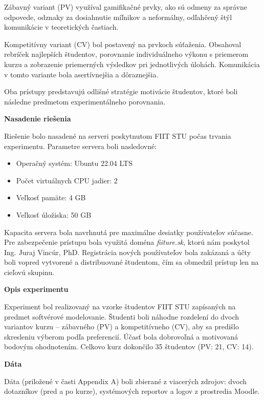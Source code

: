 
Zábavný variant (PV) využíval gamifikačné prvky, ako sú odmeny za správne odpovede, odznaky za dosiahnutie míľnikov a neformálny, odľahčený štýl komunikácie v teoretických častiach.


Kompetitívny variant (CV) bol postavený na prvkoch súťaženia. Obsahoval rebríček najlepších študentov, porovnanie individuálneho výkonu s priemerom kurzu a zobrazenie priemerných výsledkov pri jednotlivých úlohách. Komunikácia v tomto variante bola asertívnejšia a dôraznejšia.

Oba prístupy predstavujú odlišné stratégie motivácie študentov, ktoré boli následne predmetom experimentálneho porovnania.


\textbf{Nasadenie riešenia}

Riešenie bolo nasadené na serveri poskytnutom FIIT STU počas trvania experimentu. Parametre servera boli nasledovné:

\begin{itemize}
\item Operačný systém: Ubuntu 22.04 LTS
\item Počet virtuálnych CPU jadier: 2
\item Veľkosť pamäte: 4 GB
\item Veľkosť úložiska: 50 GB
\end{itemize}

Kapacita servera bola navrhnutá pre maximálne desiatky používateľov súčasne. Pre zabezpečenie prístupu bola využitá doména \textit{fiiture.sk}, ktorú nám poskytol Ing. Juraj Vincúr, PhD. Registrácia nových používateľov bola zakázaná a účty boli vopred vytvorené a distribuované študentom, čím sa obmedzil prístup len na cieľovú skupinu.

\textbf{Opis experimentu}

Experiment bol realizovaný na vzorke študentov FIIT STU zapísaných na predmet softvérové modelovanie. Študenti boli náhodne rozdelení do dvoch variantov kurzu – zábavného (PV) a kompetitívneho (CV), aby sa predišlo skresleniu výberom podľa preferencií. Účasť bola dobrovoľná a motivovaná bodovým ohodnotením. Celkovo kurz dokončilo 35 študentov (PV: 21, CV: 14).

\textbf{Dáta}

Dáta (priložené v časti Appendix A) boli zbierané z viacerých zdrojov: dvoch dotazníkov (pred a po kurze), systémových reportov a logov z prostredia Moodle. 

